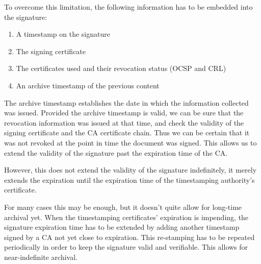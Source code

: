 To overcome this limitation, the following information has to be embedded into the signature:
\begin{enumerate}
    \item A timestamp on the signature
    \item The signing certificate
    \item The certificates used and their revocation status (\gls{OCSP} and \gls{CRL})
    \item An archive timestamp of the previous content
\end{enumerate}

The archive timestamp establishes the date in which the information collected was issued.
Provided the archive timestamp is valid,
we can be sure that the revocation information was issued at that time,
and check the validity of the signing certificate and the \gls{CA} certificate chain.
Thus we can be certain that it was not revoked at the point in time the document was signed.
This allows us to extend the validity of the signature past the expiration time of the \gls{CA}.

However, this does not extend the validity of the signature indefinitely,
it merely extends the expiration until the expiration time of the timestamping authority's certificate.

For many cases this may be enough, but it doesn't quite allow for long-time archival yet.
When the timestamping certificates' expiration is impending,
the signature expiration time has to be extended by adding another timestamp signed by a \gls{CA} not yet close to expiration.
This re-stamping has to be repeated periodically in order to keep the signature valid and verifiable.
This allows for near-indefinite archival.

